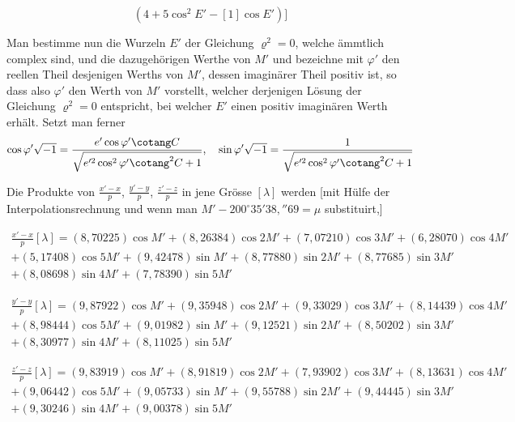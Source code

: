\documentclass[10pt,a4paper]{article}
\begin{document}
\begin{equation*}
[= [8{,}304\,6988 - 10](4 + 5\cos^2 E' - [1]\cos E')]
\end{equation*}

Man bestimme nun die Wurzeln $E'$ der Gleichung $\varrho^2 = 0$, welche \"{a}mmtlich complex sind, und die dazugeh\"origen Werthe von $M'$ und bezeichne mit $\varphi'$ den reellen Theil desjenigen Werths von $M'$, dessen imagin\"arer Theil positiv ist, so dass also $\varphi'$ den Werth von $M'$ vorstellt, welcher derjenigen L\"osung der Gleichung $\varrho^2 = 0$ entspricht, bei welcher $E'$ einen positiv imagin\"aren Werth erh\"alt. Setzt man ferner
\begin{equation*}
\cos\varphi'\sqrt{-1} = \frac{e'\cos\varphi'\cotang C}{\sqrt{e'^2\cos^2\varphi'\cotang^2 C + 1}},\quad
\sin\varphi'\sqrt{-1} = \frac{1}{\sqrt{e'^2\cos^2\varphi'\cotang^2 C + 1}}
\end{equation*}

\newpage
\noindent
Die Produkte von $\frac{x'-x}{p}$, $\frac{y'-y}{p}$, $\frac{z'-z}{p}$ in jene Gr\"osse $[\lambda]$ werden [mit H\"ulfe der Interpolationsrechnung und wenn man $M' - 200^\circ 35'38{,}''69 = \mu$ substituirt,]

\begin{multline*}
\frac{x'-x}{p}[\lambda] = (8{,}70225)\cos M' + (8{,}26384)\cos 2M' + (7{,}07210)\cos 3M' + (6{,}28070)\cos 4M' \\
+ (5{,}17408)\cos 5M' + (9{,}42478)\sin M' + (8{,}77880)\sin 2M' + (8{,}77685)\sin 3M' \\
+ (8{,}08698)\sin 4M' + (7{,}78390)\sin 5M'
\end{multline*}

\begin{multline*}
\frac{y'-y}{p}[\lambda] = (9{,}87922)\cos M' + (9{,}35948)\cos 2M' + (9{,}33029)\cos 3M' + (8{,}14439)\cos 4M' \\
+ (8{,}98444)\cos 5M' + (9{,}01982)\sin M' + (9{,}12521)\sin 2M' + (8{,}50202)\sin 3M' \\
+ (8{,}30977)\sin 4M' + (8{,}11025)\sin 5M'
\end{multline*}

\begin{multline*}
\frac{z'-z}{p}[\lambda] = (9{,}83919)\cos M' + (8{,}91819)\cos 2M' + (7{,}93902)\cos 3M' + (8{,}13631)\cos 4M' \\
+ (9{,}06442)\cos 5M' + (9{,}05733)\sin M' + (9{,}55788)\sin 2M' + (9{,}44445)\sin 3M' \\
+ (9{,}30246)\sin 4M' + (9{,}00378)\sin 5M'
\end{multline*}
\end{document}
